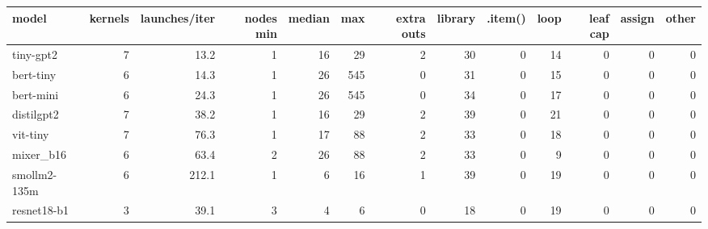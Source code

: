 \begin{tabular}{lrrrrrrrrrrrr}
\toprule
model & kernels & launches/iter & nodes min & median & max & extra outs & library & .item() & loop & leaf cap & assign & other \\
\midrule
tiny-gpt2 & 7 & 13.2 & 1 & 16 & 29 & 2 & 30 & 0 & 14 & 0 & 0 & 0 \\
bert-tiny & 6 & 14.3 & 1 & 26 & 545 & 0 & 31 & 0 & 15 & 0 & 0 & 0 \\
bert-mini & 6 & 24.3 & 1 & 26 & 545 & 0 & 34 & 0 & 17 & 0 & 0 & 0 \\
distilgpt2 & 7 & 38.2 & 1 & 16 & 29 & 2 & 39 & 0 & 21 & 0 & 0 & 0 \\
vit-tiny & 7 & 76.3 & 1 & 17 & 88 & 2 & 33 & 0 & 18 & 0 & 0 & 0 \\
mixer\_b16 & 6 & 63.4 & 2 & 26 & 88 & 2 & 33 & 0 & 9 & 0 & 0 & 0 \\
smollm2-135m & 6 & 212.1 & 1 & 6 & 16 & 1 & 39 & 0 & 19 & 0 & 0 & 0 \\
resnet18-b1 & 3 & 39.1 & 3 & 4 & 6 & 0 & 18 & 0 & 19 & 0 & 0 & 0 \\
\bottomrule
\end{tabular}
